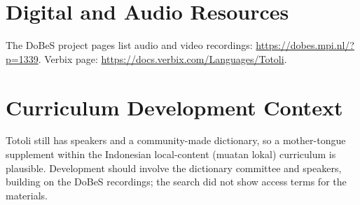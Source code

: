 \documentclass[12pt]{article}
\begin{document}
\section{Digital and Audio Resources}
The DoBeS project pages list audio and video recordings: \url{https://dobes.mpi.nl/?p=1339}. Verbix page: \url{https://docs.verbix.com/Languages/Totoli}.

\section{Curriculum Development Context}
Totoli still has speakers and a community-made dictionary, so a mother-tongue supplement within the Indonesian local-content (muatan lokal) curriculum is plausible. Development should involve the dictionary committee and speakers, building on the DoBeS recordings; the search did not show access terms for the materials.
\end{document}
